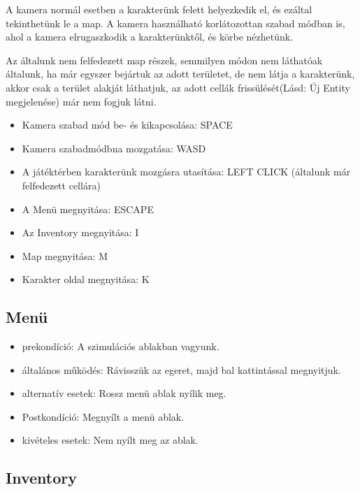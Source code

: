 
A kamera normál esetben a karakterünk felett helyezkedik el, és ezáltal tekinthetünk le a map.
A kamera használható korlátozottan szabad módban is, ahol a kamera elrugaszkodik a karakterünktől, és körbe nézhetünk.


Az általunk nem felfedezett map részek, semmilyen módon nem láthatóak általunk, ha már egyszer bejártuk az adott területet, 
de nem látja a karakterünk, akkor csak a terület alakját láthatjuk, az adott cellák frissülését(Lásd: Új Entity megjelenése) már nem fogjuk látni.


\begin{itemize}
    \item Kamera szabad mód be- és kikapcsolása: SPACE
    \item Kamera szabadmódbna mozgatása: WASD
    \item A játéktérben karakterünk mozgásra utasítása: LEFT CLICK (általunk már felfedezett cellára)
    \item A Menü megnyitása: ESCAPE
    \item Az Inventory megnyitása: I
    \item Map megnyitása: M
    \item Karakter oldal megnyitása: K
\end{itemize}


\subsection{Menü}

\begin{itemize}
    \item prekondíció: A szimulációs ablakban vagyunk.
    \item általános működés: Rávisszük az egeret, majd bal kattintással megnyitjuk.
    \item alternatív esetek: Rossz menü ablak nyílik meg.
    \item Postkondíció: Megnyílt a menü ablak.
    \item kivételes esetek: Nem nyílt meg az ablak.
\end{itemize}

\subsection{Inventory}

